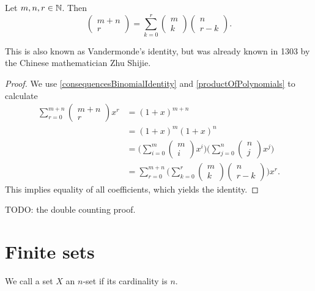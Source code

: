 \begin{proposition}
Let $m,n,r\in \mathbb{N}$. Then
\[ \begin{pmatrix}
m + n \\ r
\end{pmatrix} = \sum_{k=0}^r \begin{pmatrix}
m \\ k
\end{pmatrix}\begin{pmatrix}
n \\ r-k
\end{pmatrix}. \]
\end{proposition}
This is also known as Vandermonde's identity, but was already known in 1303 by the Chinese mathematician Zhu Shijie.
\begin{proof}
We use \ref{consequencesBinomialIdentity} and \ref{productOfPolynomials} to calculate
\begin{align*}
\sum_{r=0}^{m+n}\begin{pmatrix}
m+n \\ r
\end{pmatrix}x^r &= (1+x)^{m+n} \\
&= (1+x)^{m}(1+x)^{n} \\
&= \bigg(\sum_{i=0}^{m}\begin{pmatrix}
m \\ i
\end{pmatrix}x^i\bigg)\bigg(\sum_{j=0}^{n}\begin{pmatrix}
n \\ j
\end{pmatrix}x^j\bigg) \\
&= \sum_{r=0}^{m+n}\bigg(\sum_{k=0}^r \begin{pmatrix}
m \\ k
\end{pmatrix}\begin{pmatrix}
n \\ r-k
\end{pmatrix}\bigg)x^r.
\end{align*}
This implies equality of all coefficients, which yields the identity.
\end{proof}
TODO: the double counting proof.

\section{Finite sets}
\begin{definition}
We call a set $X$ an $n$-set if its cardinality is $n$.
\end{definition}

